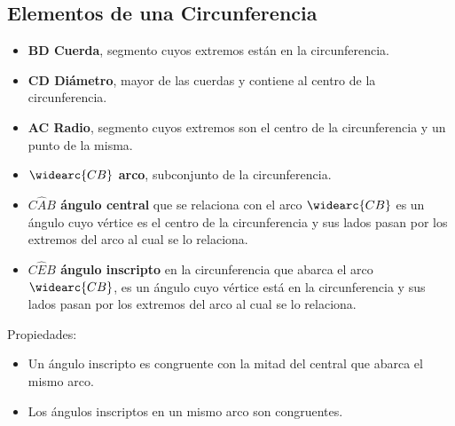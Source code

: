 \documentclass[10pt]{article}
\begin{document}
\subsection{Elementos de una Circunferencia}
\begin{multicols}{2}
\begin{itemize}
\item \textbf{BD Cuerda}, segmento cuyos extremos están en la circunferencia.
\item \textbf{CD Diámetro}, mayor de las cuerdas y contiene al centro de la circunferencia.
\item \textbf{AC Radio}, segmento cuyos extremos son el centro de la circunferencia y un punto de la misma.
\item \textbf{$\widearc{CB}$ arco}, subconjunto de la circunferencia.
\end{itemize}
\end{multicols}
\begin{itemize}
\item \textbf{$C\hat{A}B$ ángulo central} que se relaciona con el arco $\widearc{CB}$ es un ángulo cuyo vértice es el centro de la circunferencia y sus lados pasan por los extremos del arco al cual se lo relaciona.
\item \textbf{$C\hat{E}B$ ángulo inscripto} en la circunferencia que abarca el arco $\widearc{CB}$, es un ángulo cuyo vértice está en la circunferencia y sus lados pasan por los extremos del arco al cual se lo relaciona.
\end{itemize}
Propiedades:
\begin{itemize}
\item {} Un ángulo inscripto es congruente con la mitad del central que abarca el mismo arco.
\item {} Los ángulos inscriptos en un mismo arco son congruentes.\\
\end{itemize}
\end{document}

